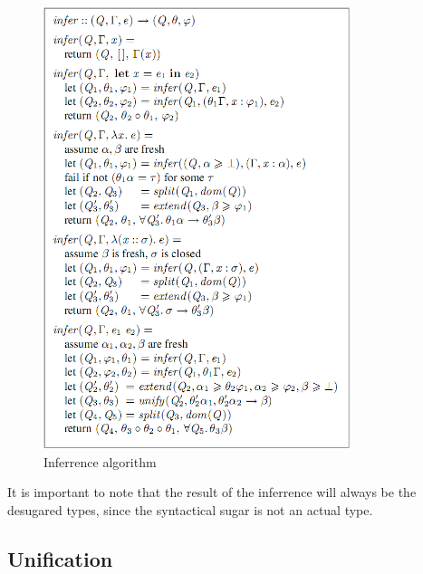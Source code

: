 \documentclass[12pt, a4paper, oneside]{article}
\begin{document}
\begin{figure}[h!]
  \centering
    \includegraphics[width=0.8\textwidth]{infer}
  \caption{Inferrence algorithm}
\end{figure}

It is important to note that the result of the inferrence will always be the desugared types, since the syntactical sugar is not an actual type.

\subsection{Unification}
\end{document}
